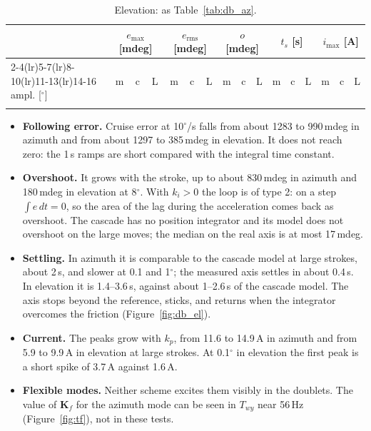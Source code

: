 \documentclass[10pt,a4paper]{article}
\numberwithin{equation}{section}
\begin{document}
\begin{table}[H]\centering\scriptsize\setlength{\tabcolsep}{2.6pt}
\caption{Elevation: as Table~\ref{tab:db_az}.}\label{tab:db_el}
\begin{tabular}{lrrrrrrrrrrrrrrr}\toprule
& \multicolumn{3}{c}{$e_\mathrm{max}$ [mdeg]} & \multicolumn{3}{c}{$e_\mathrm{rms}$ [mdeg]} & \multicolumn{3}{c}{$o$ [mdeg]} & \multicolumn{3}{c}{$t_s$ [s]} & \multicolumn{3}{c}{$i_\mathrm{max}$ [A]} \\
\cmidrule(lr){2-4}\cmidrule(lr){5-7}\cmidrule(lr){8-10}\cmidrule(lr){11-13}\cmidrule(lr){14-16}
ampl. [$^\circ$] & m & c & L & m & c & L & m & c & L & m & c & L & m & c & L \\ \midrule
\\ \bottomrule
\end{tabular}\end{table}

\begin{itemize}
\item \textbf{Following error.} Cruise error at 10$^\circ$/s falls from about 1283 to 990\,mdeg in azimuth and from about 1297 to 385\,mdeg in elevation. It does not reach zero: the 1\,s ramps are short compared with the integral time constant.
\item \textbf{Overshoot.} It grows with the stroke, up to about 830\,mdeg in azimuth and 180\,mdeg in elevation at 8$^\circ$. With $k_i>0$ the loop is of type 2: on a step $\int e\,dt=0$, so the area of the lag during the acceleration comes back as overshoot. The cascade has no position integrator and its model does not overshoot on the large moves; the median on the real axis is at most 17\,mdeg.
\item \textbf{Settling.} In azimuth it is comparable to the cascade model at large strokes, about 2\,s, and slower at 0.1 and 1$^\circ$; the measured axis settles in about 0.4\,s. In elevation it is 1.4--3.6\,s, against about 1--2.6\,s of the cascade model. The axis stops beyond the reference, sticks, and returns when the integrator overcomes the friction (Figure~\ref{fig:db_el}).
\item \textbf{Current.} The peaks grow with $k_p$, from 11.6 to 14.9\,A in azimuth and from 5.9 to 9.9\,A in elevation at large strokes. At 0.1$^\circ$ in elevation the first peak is a short spike of 3.7\,A against 1.6\,A.
\item \textbf{Flexible modes.} Neither scheme excites them visibly in the doublets. The value of $\mathbf K_f$ for the azimuth mode can be seen in $T_{wy}$ near 56\,Hz (Figure~\ref{fig:tf}), not in these tests.
\end{itemize}
\end{document}
